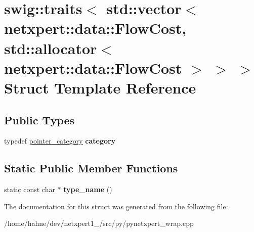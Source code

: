 \hypertarget{structswig_1_1traits_3_01std_1_1vector_3_01netxpert_1_1data_1_1FlowCost_00_01std_1_1allocator_3_49ccc0e53bc84e4be4da95fd93872f01}{}\section{swig\+:\+:traits$<$ std\+:\+:vector$<$ netxpert\+:\+:data\+:\+:Flow\+Cost, std\+:\+:allocator$<$ netxpert\+:\+:data\+:\+:Flow\+Cost $>$ $>$ $>$ Struct Template Reference}
\label{structswig_1_1traits_3_01std_1_1vector_3_01netxpert_1_1data_1_1FlowCost_00_01std_1_1allocator_3_49ccc0e53bc84e4be4da95fd93872f01}
\subsection*{Public Types}
\begin{DoxyCompactItemize}
\item 
typedef \hyperlink{structswig_1_1pointer__category}{pointer\+\_\+category} {\bfseries category}\hypertarget{structswig_1_1traits_3_01std_1_1vector_3_01netxpert_1_1data_1_1FlowCost_00_01std_1_1allocator_3_49ccc0e53bc84e4be4da95fd93872f01_a8f3d5a0ee0e7d05eadfed9445680a385}{}\label{structswig_1_1traits_3_01std_1_1vector_3_01netxpert_1_1data_1_1FlowCost_00_01std_1_1allocator_3_49ccc0e53bc84e4be4da95fd93872f01_a8f3d5a0ee0e7d05eadfed9445680a385}

\end{DoxyCompactItemize}
\subsection*{Static Public Member Functions}
\begin{DoxyCompactItemize}
\item 
static const char $\ast$ {\bfseries type\+\_\+name} ()\hypertarget{structswig_1_1traits_3_01std_1_1vector_3_01netxpert_1_1data_1_1FlowCost_00_01std_1_1allocator_3_49ccc0e53bc84e4be4da95fd93872f01_a9c9785e5036a34feb333d346922273cb}{}\label{structswig_1_1traits_3_01std_1_1vector_3_01netxpert_1_1data_1_1FlowCost_00_01std_1_1allocator_3_49ccc0e53bc84e4be4da95fd93872f01_a9c9785e5036a34feb333d346922273cb}

\end{DoxyCompactItemize}


The documentation for this struct was generated from the following file\+:\begin{DoxyCompactItemize}
\item 
/home/hahne/dev/netxpert1\+\_/src/py/pynetxpert\+\_\+wrap.\+cpp\end{DoxyCompactItemize}

